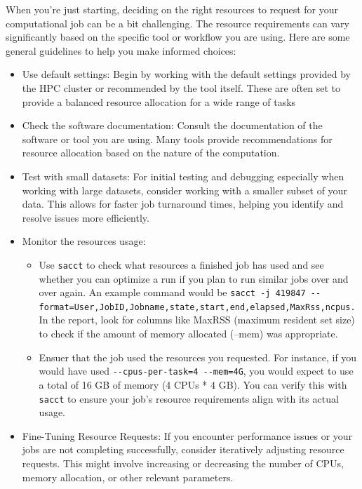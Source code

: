 \documentclass[
  letterpaper,
  DIV=11,
  numbers=noendperiod]{scrreprt}
\providecommand{\tightlist}{%
  \setlength{\itemsep}{0pt}\setlength{\parskip}{0pt}}\usepackage{longtable,booktabs,array}
\begin{document}
When you're just starting, deciding on the right resources to request
for your computational job can be a bit challenging. The resource
requirements can vary significantly based on the specific tool or
workflow you are using. Here are some general guidelines to help you
make informed choices:

\begin{itemize}
\tightlist
\item
  Use default settings: Begin by working with the default settings
  provided by the HPC cluster or recommended by the tool itself. These
  are often set to provide a balanced resource allocation for a wide
  range of tasks
\item
  Check the software documentation: Consult the documentation of the
  software or tool you are using. Many tools provide recommendations for
  resource allocation based on the nature of the computation.
\item
  Test with small datasets: For initial testing and debugging especially
  when working with large datasets, consider working with a smaller
  subset of your data. This allows for faster job turnaround times,
  helping you identify and resolve issues more efficiently.
\item
  Monitor the resources usage:

  \begin{itemize}
  \tightlist
  \item
    Use \texttt{sacct} to check what resources a finished job has used
    and see whether you can optimize a run if you plan to run similar
    jobs over and over again. An example command would be
    \texttt{sacct\ -j\ 419847\ -\/-format=User,JobID,Jobname,state,start,end,elapsed,MaxRss,ncpus.}
    In the report, look for columns like MaxRSS (maximum resident set
    size) to check if the amount of memory allocated (--mem) was
    appropriate.
  \item
    Ensuer that the job used the resources you requested. For instance,
    if you would have used \texttt{-\/-cpus-per-task=4\ -\/-mem=4G}, you
    would expect to use a total of 16 GB of memory (4 CPUs * 4 GB). You
    can verify this with \texttt{sacct} to ensure your job's resource
    requirements align with its actual usage.
  \end{itemize}
\item
  Fine-Tuning Resource Requests: If you encounter performance issues or
  your jobs are not completing successfully, consider iteratively
  adjusting resource requests. This might involve increasing or
  decreasing the number of CPUs, memory allocation, or other relevant
  parameters.
\end{itemize}
\end{document}
